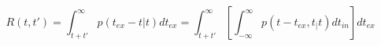 \begin{equation}
R(t,t') = \int_{t+t'}^\infty p(t_{ex}-t|t) dt_{ex}  = \int_{t+t'}^\infty \left[ \int_{-\infty}^\infty p(t-t_{ex},t_|t) dt_{in} \right]  dt_{ex}
\end{equation}